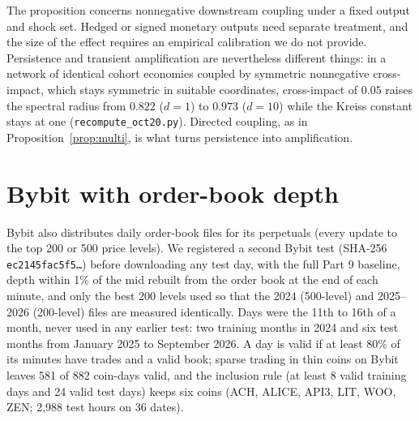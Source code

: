\documentclass[12pt]{article}
\theoremstyle{definition}
\theoremstyle{remark}
\begin{document}
The proposition concerns nonnegative downstream coupling under a fixed output and shock set. Hedged or signed monetary outputs need separate treatment, and the size of the effect requires an empirical calibration we do not provide. Persistence and transient amplification are nevertheless different things: in a network of identical cohort economies coupled by symmetric nonnegative cross-impact, which stays symmetric in suitable coordinates, cross-impact of $0.05$ raises the spectral radius from $0.822$ ($d=1$) to $0.973$ ($d=10$) while the Kreiss constant stays at one (\texttt{recompute\_oct20.py}). Directed coupling, as in Proposition~\ref{prop:multi}, is what turns persistence into amplification.
\section{Bybit with order-book depth}
Bybit also distributes daily order-book files for its perpetuals (every update to the top 200 or 500 price levels). We registered a second Bybit test (SHA-256 \texttt{ec2145fac5f5\ldots}) before downloading any test day, with the full Part 9 baseline, depth within 1\% of the mid rebuilt from the order book at the end of each minute, and only the best 200 levels used so that the 2024 (500-level) and 2025--2026 (200-level) files are measured identically. Days were the 11th to 16th of a month, never used in any earlier test: two training months in 2024 and six test months from January 2025 to September 2026. A day is valid if at least 80\% of its minutes have trades and a valid book; sparse trading in thin coins on Bybit leaves 581 of 882 coin-days valid, and the inclusion rule (at least 8 valid training days and 24 valid test days) keeps six coins (ACH, ALICE, API3, LIT, WOO, ZEN; 2{,}988 test hours on 36 dates).
\end{document}
